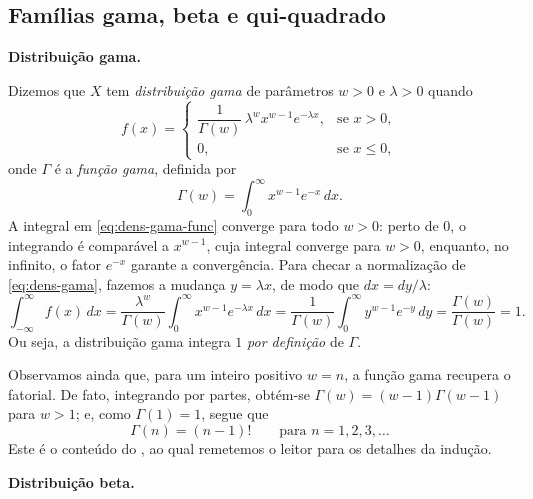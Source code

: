 \documentclass[12pt,portuguese]{article}
\theoremstyle{definition}
\theoremstyle{plainexercise}
\theoremstyle{starredexercise}
\theoremstyle{definition}
\begin{document}
\subsection{Famílias gama, beta e qui-quadrado}

\medskip
\noindent\textbf{Distribuição gama.}

Dizemos que $X$ tem \emph{distribuição gama} de parâmetros $w>0$ e
$\lambda>0$ quando
\begin{equation}
  f(x) = \begin{cases}
    \dfrac{1}{\Gamma(w)}\,\lambda^w x^{w-1} e^{-\lambda x}, & \text{se } x > 0, \\[0.3cm]
    0, & \text{se } x \leqslant 0,
  \end{cases}
  \label{eq:dens-gama}
\end{equation}
onde $\Gamma$ é a \emph{função gama}, definida por
\begin{equation}
  \Gamma(w) = \int_0^{\infty} x^{w-1} e^{-x}\,dx.
  \label{eq:dens-gama-func}
\end{equation}
A integral em \eqref{eq:dens-gama-func} converge para todo $w>0$: perto de
$0$, o integrando é comparável a $x^{w-1}$, cuja integral converge para
$w>0$, enquanto, no infinito, o fator $e^{-x}$ garante a convergência. Para
checar a normalização de \eqref{eq:dens-gama}, fazemos a mudança
$y=\lambda x$, de modo que $dx = dy/\lambda$:
\[
  \int_{-\infty}^{\infty} f(x)\,dx
  = \frac{\lambda^w}{\Gamma(w)}\int_0^{\infty} x^{w-1} e^{-\lambda x}\,dx
  = \frac{1}{\Gamma(w)}\int_0^{\infty} y^{w-1} e^{-y}\,dy
  = \frac{\Gamma(w)}{\Gamma(w)} = 1.
\]
Ou seja, a distribuição gama integra $1$ \emph{por definição} de $\Gamma$.

Observamos ainda que, para um inteiro positivo $w=n$, a função gama
recupera o fatorial. De fato, integrando por partes, obtém-se
$\Gamma(w) = (w-1)\Gamma(w-1)$ para $w>1$; e, como $\Gamma(1)=1$, segue que
\[
  \Gamma(n) = (n-1)! \qquad \text{para } n=1,2,3,\dots
\]
Este é o conteúdo do , ao qual
remetemos o leitor para os detalhes da indução.

\medskip
\noindent\textbf{Distribuição beta.}
\end{document}

